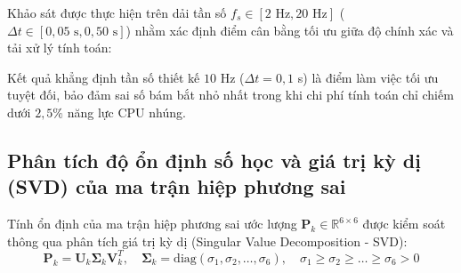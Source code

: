 Khảo sát được thực hiện trên dải tần số $f_s \in [2\text{ Hz}, 20\text{ Hz}]$ ($\Delta t \in [0{,}05\text{ s}, 0{,}50\text{ s}]$) nhằm xác định điểm cân bằng tối ưu giữa độ chính xác và tải xử lý tính toán:

\begin{table}[H]
\centering
\caption{Đo đạc độ nhạy sai số RMSE và mức độ tiêu thụ tài nguyên theo chu kỳ trích mẫu $\Delta t$}
\label{tab:sampling-rate-sensitivity-w13}
\end{table}

Kết quả khẳng định tần số thiết kế $10$ Hz ($\Delta t = 0{,}1$ s) là điểm làm việc tối ưu tuyệt đối, bảo đảm sai số bám bắt nhỏ nhất trong khi chi phí tính toán chỉ chiếm dưới $2{,}5\%$ năng lực CPU nhúng.

\subsection{Phân tích độ ổn định số học và giá trị kỳ dị (SVD) của ma trận hiệp phương sai}

\hspace{0.5cm} Tính ổn định của ma trận hiệp phương sai ước lượng $\mathbf{P}_k \in \mathbb{R}^{6 \times 6}$ được kiểm soát thông qua phân tích giá trị kỳ dị (Singular Value Decomposition - SVD):
\begin{equation}
\mathbf{P}_k = \mathbf{U}_k \boldsymbol{\Sigma}_k \mathbf{V}_k^T, \quad \boldsymbol{\Sigma}_k = \text{diag}(\sigma_1, \sigma_2, \dots, \sigma_6), \quad \sigma_1 \ge \sigma_2 \ge \dots \ge \sigma_6 > 0
\label{eq:svd-covariance-w13}
\end{equation}

